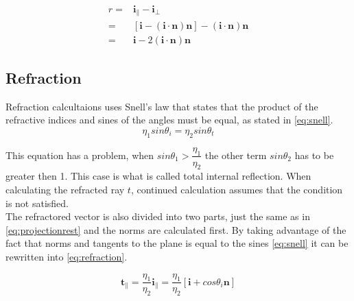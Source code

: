 \documentclass[]{report}   %
\begin{document}
\begin{subequations}\label{eq:reflectioncalc}
\begin{align}
r =& \mathbf{i}_\| - \mathbf{i}_\bot \\
  =& [\mathbf{i} - (\mathbf{i} \cdot \mathbf{n})\mathbf{n}] - (\mathbf{i} \cdot \mathbf{n}) \mathbf{n} \\
  =& \mathbf{i} - 2 ( \mathbf{i} \cdot \mathbf{n} ) \mathbf{n}
\end{align}
\end{subequations}


\subsection{Refraction}

Refraction calcultaions uses Snell's law that states that the product of the refractive indices and sines of the angles must be equal, as stated in \autoref{eq:snell}.\\

\begin{equation} \label{eq:snell}
\eta_1 sin \theta_i = \eta_2 sin \theta_t
\end{equation}

This equation has a problem, when $ sin \theta_1 > \dfrac{\eta_1}{\eta_2} $
the other term $ sin \theta_2 $ has to be greater then 1. 
This case is what is called total internal reflection.
When calculating the refracted ray $ t $, continued calculation assumes that the condition is not satisfied.\\

The refractored vector is also divided into two parts, just the same as in \autoref{eq:projectionrest} and the norms are calculated first. By taking advantage of the fact that norms and tangents to the plane is equal to the sines \autoref{eq:snell} it can be rewritten into \autoref{eq:refraction}.

\begin{equation} \label{eq:refraction}
\mathbf{t}_\| = \frac{\eta_1}{\eta_2} \mathbf{i}_\| = \frac{\eta_1}{\eta_2} 
[\mathbf{i} + cos \theta_i \mathbf{n}]
\end{equation}
\end{document}
